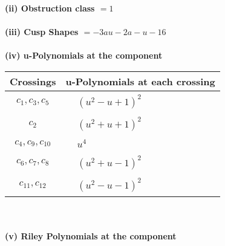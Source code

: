 \documentclass[1p]{elsarticle_modified}
\theoremstyle{definition}
\begin{document}
\flushleft \textbf{(ii) Obstruction class $= 1$}\\~\\
\flushleft \textbf{(iii) Cusp Shapes $= -3 a u-2 a- u-16$}\\~\\
\newpage\renewcommand{\arraystretch}{1}
\flushleft \textbf{(iv) u-Polynomials at the component}\newline \\
\begin{tabular}{m{50pt}|m{274pt}}
Crossings & \hspace{64pt}u-Polynomials at each crossing \\
\hline $$\begin{aligned}c_{1},c_{3},c_{5}\end{aligned}$$&$\begin{aligned}
&(u^2- u+1)^2
\end{aligned}$\\
\hline $$\begin{aligned}c_{2}\end{aligned}$$&$\begin{aligned}
&(u^2+u+1)^2
\end{aligned}$\\
\hline $$\begin{aligned}c_{4},c_{9},c_{10}\end{aligned}$$&$\begin{aligned}
&u^4
\end{aligned}$\\
\hline $$\begin{aligned}c_{6},c_{7},c_{8}\end{aligned}$$&$\begin{aligned}
&(u^2+u-1)^2
\end{aligned}$\\
\hline $$\begin{aligned}c_{11},c_{12}\end{aligned}$$&$\begin{aligned}
&(u^2- u-1)^2
\end{aligned}$\\
\hline
\end{tabular}\\~\\
\newpage\renewcommand{\arraystretch}{1}
\flushleft \textbf{(v) Riley Polynomials at the component}\newline \\
\end{document}
